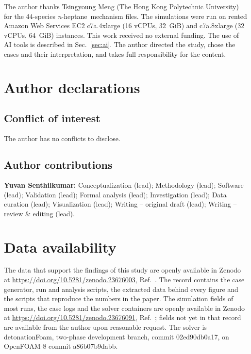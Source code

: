 \documentclass[aip,pof,preprint,amsmath,amssymb]{revtex4-2}
\newcommand{\nh}{\textit{n}-heptane}
\begin{document}
\begin{acknowledgments}
The author thanks Tsingyoung Meng (The Hong Kong Polytechnic University) for the 44-species \nh\ mechanism files. The simulations were run on rented Amazon Web Services EC2 c7a.4xlarge (16 vCPUs, 32~GiB) and c7a.8xlarge (32 vCPUs, 64~GiB) instances. This work received no external funding. The use of AI tools is described in Sec.~\ref{sec:ai}. The author directed the study, chose the cases and their interpretation, and takes full responsibility for the content.
\end{acknowledgments}

\section*{Author declarations}
\subsection*{Conflict of interest}
The author has no conflicts to disclose.
\subsection*{Author contributions}
\textbf{Yuvan Senthilkumar:} Conceptualization (lead); Methodology (lead); Software (lead); Validation (lead); Formal analysis (lead); Investigation (lead); Data curation (lead); Visualization (lead); Writing -- original draft (lead); Writing -- review \& editing (lead).

\section*{Data availability}
The data that support the findings of this study are openly available in Zenodo at \url{https://doi.org/10.5281/zenodo.23676003}, Ref.~. The record contains the case generator, run and analysis scripts, the extracted data behind every figure and the scripts that reproduce the numbers in the paper. The simulation fields of most runs, the case logs and the solver containers are openly available in Zenodo at \url{https://doi.org/10.5281/zenodo.23676091}, Ref.~; fields not yet in that record are available from the author upon reasonable request. The solver is detonationFoam, two-phase development branch, commit 02ed90db0a17, on OpenFOAM-8 commit a86b07b9dabb.
\end{document}
